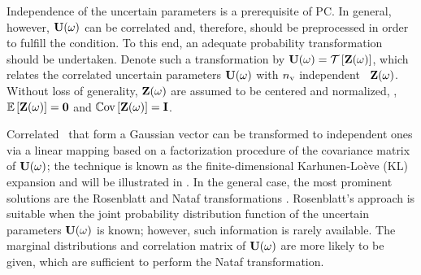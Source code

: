Independence of the uncertain parameters is a prerequisite of PC. In general, however, $\mathbf{U}(\omega)$ can be correlated and, therefore, should be preprocessed in order to fulfill the condition. To this end, an adequate probability transformation should be undertaken. Denote such a transformation by $\vU(\o) = \oTransform{\vZ(\o)}$, which relates the correlated uncertain parameters $\mathbf{U}(\omega)$ with ${n_\text{v}}$ independent \rvs\ $\mathbf{Z}(\omega)$. Without loss of generality, $\mathbf{Z}(\omega)$ are assumed to be centered and normalized, \ie, $\oExp{\vZ(\o)} = \mZero$ and $\oCov{\vZ(\o)} = \mI$.

Correlated \rvs\ that form a Gaussian vector can be transformed to independent ones via a linear mapping based on a factorization procedure of the covariance matrix of $\mathbf{U}(\omega)$; the technique is known as the finite-dimensional Karhunen-Lo\`{e}ve (KL) expansion and will be illustrated in . In the general case, the most prominent solutions are the Rosenblatt and Nataf transformations \cite{eldred2009}. Rosenblatt's approach is suitable when the joint probability distribution function of the uncertain parameters $\mathbf{U}(\omega)$ is known; however, such information is rarely available. The marginal distributions and correlation matrix of $\mathbf{U}(\omega)$ are more likely to be given, which are sufficient to perform the Nataf transformation.

